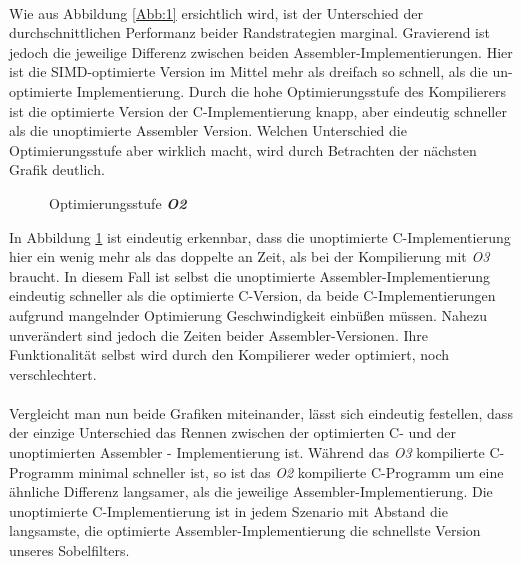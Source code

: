 \documentclass[course=asp]{aspdoc}
\begin{document}
\\Wie aus Abbildung \ref{Abb:1} ersichtlich wird, ist der Unterschied der durchschnittlichen Performanz beider Randstrategien marginal. Gravierend ist jedoch die jeweilige Differenz zwischen beiden Assembler-Implementierungen. Hier ist die SIMD-optimierte Version im Mittel mehr als dreifach so schnell, als die un-optimierte Implementierung. Durch die hohe Optimierungsstufe des Kompilierers ist die optimierte Version der C-Implementierung knapp, aber eindeutig schneller als die unoptimierte Assembler Version. Welchen Unterschied die Optimierungsstufe aber wirklich macht, wird durch Betrachten der nächsten Grafik deutlich. 

\begin{figure}[ht!]
\caption{Optimierungsstufe \textbf{\textit{O2}}}
\label{Abb:2}
\begin{center}
\end{center}
\end{figure}


In Abbildung \ref{Abb:2} ist eindeutig erkennbar, dass die unoptimierte C-Implementierung hier ein wenig mehr als das doppelte an Zeit, als bei der Kompilierung mit \textit{O3} braucht. 
In diesem Fall ist selbst die unoptimierte Assembler-Implementierung eindeutig schneller als die optimierte C-Version, da beide C-Implementierungen aufgrund mangelnder Optimierung Geschwindigkeit einbüßen müssen. Nahezu unverändert sind jedoch die Zeiten beider Assembler-Versionen. 
Ihre Funktionalität selbst wird durch den Kompilierer weder optimiert, noch verschlechtert.\\\\
Vergleicht man nun beide Grafiken miteinander, lässt sich eindeutig festellen, dass der einzige Unterschied das Rennen zwischen der optimierten C- und der unoptimierten Assembler - Implementierung ist. Während das \textit{O3} kompilierte C-Programm minimal schneller ist, so ist das \textit{O2} kompilierte C-Programm um eine ähnliche Differenz langsamer, als die jeweilige Assembler-Implementierung. Die unoptimierte C-Implementierung ist in jedem Szenario mit Abstand die langsamste, die optimierte Assembler-Implementierung die schnellste Version unseres Sobelfilters.
\end{document}
